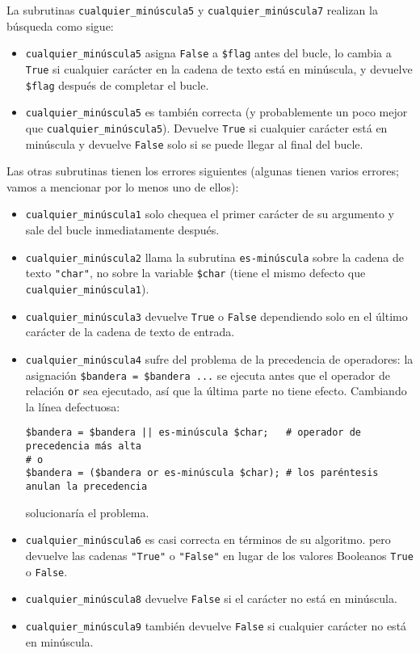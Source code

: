 La subrutinas \verb|cualquier_minúscula5| y \verb|cualquier_minúscula7| 
realizan la búsqueda como sigue:

\begin{itemize} 
\item \verb|cualquier_minúscula5| asigna {\tt False} a {\tt \$flag}
antes del bucle, lo cambia a {\tt True} si cualquier carácter 
en la cadena de texto está en minúscula, y devuelve {\tt \$flag} 
después de completar el bucle.

\item  \verb|cualquier_minúscula5| es también correcta (y probablemente
un poco mejor que \verb|cualquier_minúscula5|). Devuelve {\tt True} 
si cualquier carácter está en minúscula y devuelve {\tt False} solo
si se puede llegar al final del bucle.
\end{itemize}

Las otras subrutinas tienen los errores siguientes (algunas tienen
varios errores; vamos a mencionar por lo menos uno de ellos):
\begin{itemize} 

\item \verb|cualquier_minúscula1| solo chequea el primer
carácter de su argumento y sale del bucle inmediatamente después.

\item \verb|cualquier_minúscula2| llama la subrutina {\tt es-minúscula} 
sobre la cadena de texto {\tt "char"}, no sobre la variable 
{\tt \$char} (tiene el mismo defecto que \verb|cualquier_minúscula1|).

\item \verb|cualquier_minúscula3| devuelve {\tt True} o {\tt False} 
dependiendo solo en el último carácter de la cadena de texto de
entrada.

\item \verb|cualquier_minúscula4| sufre del problema de la precedencia
de operadores: la asignación \verb|$bandera = $bandera ...| se ejecuta
antes que el operador de relación {\tt or} sea ejecutado, así que la
última parte no tiene efecto.
Cambiando la línea defectuosa:
\begin{verbatim}
$bandera = $bandera || es-minúscula $char;   # operador de precedencia más alta
# o
$bandera = ($bandera or es-minúscula $char); # los paréntesis anulan la precedencia
\end{verbatim}
solucionaría el problema.

\item \verb|cualquier_minúscula6| es casi correcta en términos de su algoritmo.
pero devuelve las cadenas {\tt "True"} o {\tt "False"} en lugar de los valores
Booleanos {\tt True} o {\tt False}.

\item  \verb|cualquier_minúscula8| devuelve {\tt False} si el carácter no está
en minúscula.

\item  \verb|cualquier_minúscula9| también devuelve {\tt False} 
si cualquier carácter no está en minúscula.

\end{itemize}

